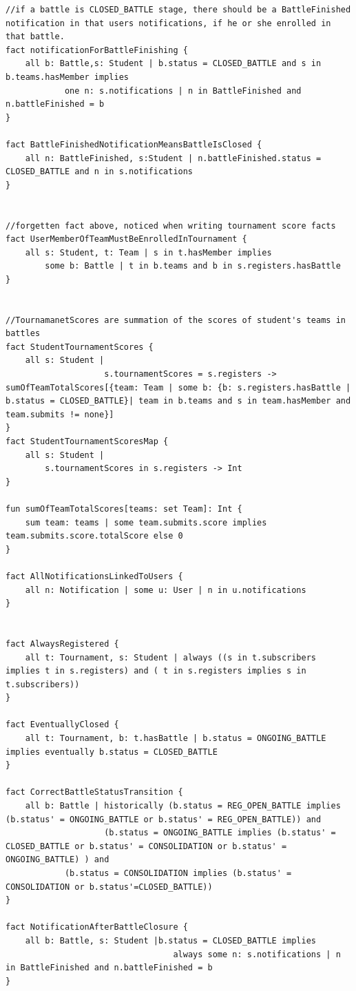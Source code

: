 \begin{lstlisting}[language=alloy]
//if a battle is CLOSED_BATTLE stage, there should be a BattleFinished notification in that users notifications, if he or she enrolled in that battle.
fact notificationForBattleFinishing {
    all b: Battle,s: Student | b.status = CLOSED_BATTLE and s in b.teams.hasMember implies 
            one n: s.notifications | n in BattleFinished and n.battleFinished = b
}

fact BattleFinishedNotificationMeansBattleIsClosed {
    all n: BattleFinished, s:Student | n.battleFinished.status = CLOSED_BATTLE and n in s.notifications
}


//forgetten fact above, noticed when writing tournament score facts 
fact UserMemberOfTeamMustBeEnrolledInTournament {
    all s: Student, t: Team | s in t.hasMember implies 
        some b: Battle | t in b.teams and b in s.registers.hasBattle
}


//TournamanetScores are summation of the scores of student's teams in battles
fact StudentTournamentScores {
    all s: Student | 
                    s.tournamentScores = s.registers -> sumOfTeamTotalScores[{team: Team | some b: {b: s.registers.hasBattle | b.status = CLOSED_BATTLE}| team in b.teams and s in team.hasMember and team.submits != none}]
}
fact StudentTournamentScoresMap {
    all s: Student | 
        s.tournamentScores in s.registers -> Int
}

fun sumOfTeamTotalScores[teams: set Team]: Int {
    sum team: teams | some team.submits.score implies team.submits.score.totalScore else 0
}

fact AllNotificationsLinkedToUsers {
    all n: Notification | some u: User | n in u.notifications
}


fact AlwaysRegistered {
    all t: Tournament, s: Student | always ((s in t.subscribers implies t in s.registers) and ( t in s.registers implies s in t.subscribers))
}

fact EventuallyClosed {
    all t: Tournament, b: t.hasBattle | b.status = ONGOING_BATTLE implies eventually b.status = CLOSED_BATTLE
}

fact CorrectBattleStatusTransition {
    all b: Battle | historically (b.status = REG_OPEN_BATTLE implies (b.status' = ONGOING_BATTLE or b.status' = REG_OPEN_BATTLE)) and
                    (b.status = ONGOING_BATTLE implies (b.status' = CLOSED_BATTLE or b.status' = CONSOLIDATION or b.status' = ONGOING_BATTLE) ) and 
			(b.status = CONSOLIDATION implies (b.status' = CONSOLIDATION or b.status'=CLOSED_BATTLE))
}

fact NotificationAfterBattleClosure {
    all b: Battle, s: Student |b.status = CLOSED_BATTLE implies
                                  always some n: s.notifications | n in BattleFinished and n.battleFinished = b
}


\end{lstlisting}

